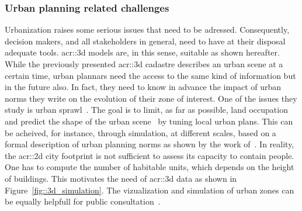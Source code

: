         \subsubsection{Urban planning related challenges}
            Urbanization raises some serious issues that need to be adressed.
            Consequently, decision makers, and all stakeholders in general, need to have at their disposal adequate tools.
            \gls{acr::3d} models are, in this sense, suitable as shown hereafter.\\
            While the previously presented \gls{acr::3d} cadastre describes an urban scene at a certain time, urban plannars need the access to the same kind of information but in the future also.
            In fact, they need to know in advance the impact of urban norms they write on the evolution of their zone of interest. 
            One of the issues they study is urban sprawl~\parencite{ludlow2006urban}.
            The goal is to limit, as far as possible, land occupation~\parencite{TANNIER2012128} and predict the shape of the urban scene~\parencite{brasebin20183d} by tuning local urban plans.
            This can be acheived, for instance, through simulation, at different scales, based on a formal description of urban planning norms as shown by the work of~\textcite{Colomb17a}.
            In reality, the \gls{acr::2d} city footprint is not sufficient to assess its capacity to contain people.
            One has to compute the number of habitable units, which depends on the height of buildings.
            This motivates the need of \gls{acr::3d} data as shown in Figure~\ref{fig::3d_simulation}.
            The  vizualization and simulation of urban zones can be equally helpfull for public consultation~\parencite{WU2010291}.\\
